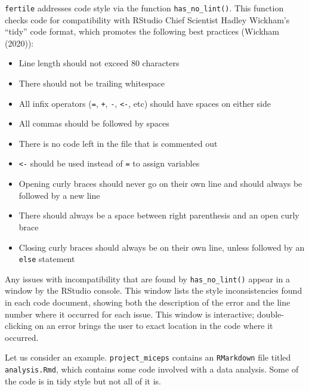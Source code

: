 \documentclass[12pt,twoside]{reedthesis}
\providecommand{\tightlist}{%
  \setlength{\itemsep}{0pt}\setlength{\parskip}{0pt}}
\begin{document}
\texttt{fertile} addresses code style via the function \texttt{has\_no\_lint()}. This function checks code for compatibility with RStudio Chief Scientist Hadley Wickham's ``tidy'' code format, which promotes the following best practices (Wickham (2020)):
\begin{itemize}
\tightlist
\item
  Line length should not exceed 80 characters
\item
  There should not be trailing whitespace
\item
  All infix operators (\texttt{=}, \texttt{+}, \texttt{-}, \texttt{\textless{}-}, etc) should have spaces on either side
\item
  All commas should be followed by spaces
\item
  There is no code left in the file that is commented out
\item
  \texttt{\textless{}-} should be used instead of \texttt{=} to assign variables
\item
  Opening curly braces should never go on their own line and should always be followed by a new line
\item
  There should always be a space between right parenthesis and an open curly brace
\item
  Closing curly braces should always be on their own line, unless followed by an \texttt{else} statement
\end{itemize}
Any issues with incompatibility that are found by \texttt{has\_no\_lint()} appear in a window by the RStudio console. This window lists the style inconsistencies found in each code document, showing both the description of the error and the line number where it occurred for each issue. This window is interactive; double-clicking on an error brings the user to exact location in the code where it occurred.

Let us consider an example. \texttt{project\_miceps} contains an \texttt{RMarkdown} file titled \texttt{analysis.Rmd}, which contains some code involved with a data analysis. Some of the code is in tidy style but not all of it is.
\end{document}
